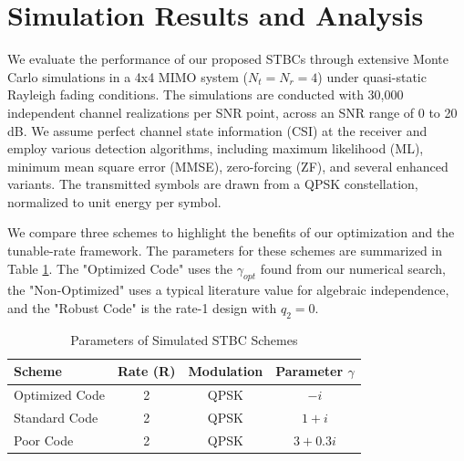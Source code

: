 \section{Simulation Results and Analysis}
We evaluate the performance of our proposed STBCs through extensive Monte Carlo simulations in a 4x4 MIMO system (\(N_t = N_r = 4\)) under quasi-static Rayleigh fading conditions. The simulations are conducted with 30,000 independent channel realizations per SNR point, across an SNR range of 0 to 20 dB. We assume perfect channel state information (CSI) at the receiver and employ various detection algorithms, including maximum likelihood (ML), minimum mean square error (MMSE), zero-forcing (ZF), and several enhanced variants. The transmitted symbols are drawn from a QPSK constellation, normalized to unit energy per symbol.

We compare three schemes to highlight the benefits of our optimization and the tunable-rate framework. The parameters for these schemes are summarized in Table \ref{tab:params}. The "Optimized Code" uses the \(\gamma_{opt}\) found from our numerical search, the "Non-Optimized" uses a typical literature value for algebraic independence, and the "Robust Code" is the rate-1 design with \(q_2 = 0\).

\begin{table}[h]
\caption{Parameters of Simulated STBC Schemes}
\label{tab:params}
\centering
\begin{tabular}{|l|c|c|c|}
\hline
\textbf{Scheme} & \textbf{Rate (R)} & \textbf{Modulation} & \textbf{Parameter \(\gamma\)} \\
\hline
Optimized Code & 2 & QPSK & \(-i\) \\
Standard Code & 2 & QPSK & \(1 + i\) \\
Poor Code & 2 & QPSK & \(3 + 0.3i\) \\
\hline
\end{tabular}
\end{table}

